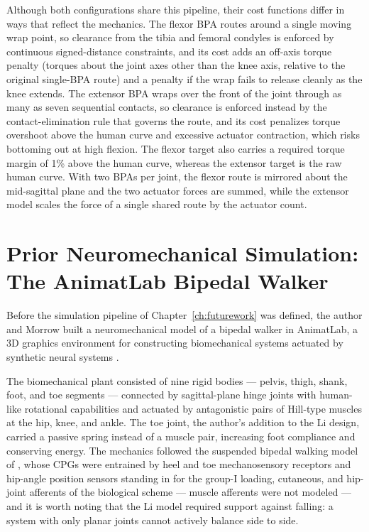 Although both configurations share this pipeline, their cost functions differ in ways that reflect the mechanics. The flexor BPA routes around a single moving wrap point, so clearance from the tibia and femoral condyles is enforced by continuous signed-distance constraints, and its cost adds an off-axis torque penalty (torques about the joint axes other than the knee axis, relative to the original single-BPA route) and a penalty if the wrap fails to release cleanly as the knee extends. The extensor BPA wraps over the front of the joint through as many as seven sequential contacts, so clearance is enforced instead by the contact-elimination rule that governs the route, and its cost penalizes torque overshoot above the human curve and excessive actuator contraction, which risks bottoming out at high flexion. The flexor target also carries a required torque margin of 1\% above the human curve, whereas the extensor target is the raw human curve. With two BPAs per joint, the flexor route is mirrored about the mid-sagittal plane and the two actuator forces are summed, while the extensor model scales the force of a single shared route by the actuator count.

\section{Prior Neuromechanical Simulation: The AnimatLab Bipedal Walker}\label{sec:prior_walker}

Before the simulation pipeline of Chapter~\ref{ch:futurework} was defined, the author and Morrow built a neuromechanical model of a bipedal walker in AnimatLab, a 3D graphics environment for constructing biomechanical systems actuated by synthetic neural systems \citep{cofer_animatlab_2010}. 

The biomechanical plant consisted of nine rigid bodies --- pelvis, thigh, shank, foot, and toe segments --- connected by sagittal-plane hinge joints with human-like rotational capabilities and actuated by antagonistic pairs of Hill-type muscles at the hip, knee, and ankle. The toe joint, the author's addition to the Li design, carried a passive spring instead of a muscle pair, increasing foot compliance and conserving energy. The mechanics followed the suspended bipedal walking model of \citet{li_bipedal_2017}, whose CPGs were entrained by heel and toe mechanosensory receptors and hip-angle position sensors standing in for the group-I loading, cutaneous, and hip-joint afferents of the biological scheme --- muscle afferents were not modeled --- and it is worth noting that the Li model required support against falling: a system with only planar joints cannot actively balance side to side.

